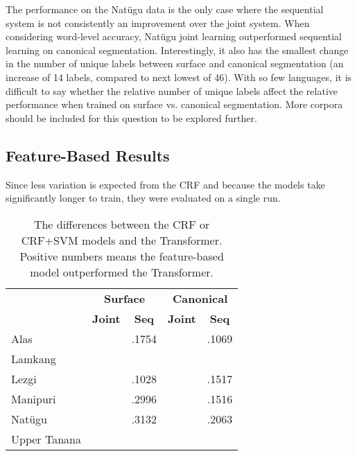 The performance on the Nat\"ugu data is the only case where the sequential system is not consistently an improvement over the joint system. 
When considering word-level accuracy, Nat\"ugu joint learning outperformed sequential learning on canonical segmentation. Interestingly, it also has the smallest change in the number of unique labels between surface and canonical segmentation (an increase of 14 labels, compared to next lowest of 46). With so few languages, it is difficult to say whether the relative number of unique labels affect the relative performance when trained on surface vs. canonical segmentation. More corpora should be included for this question to be explored further. %
 

\subsection{Feature-Based Results}

Since less variation is expected from the CRF and because the models take significantly longer to train, they were evaluated on a single run. 

\begin{table}
    \centering
    \begin{tabular}{l|cc|cc}
        & \multicolumn{2}{c|}{\textbf{Surface}} & \multicolumn{2}{c}{\textbf{Canonical}} \\
        & \textbf{Joint} & \textbf{Seq} & \textbf{Joint} & \textbf{Seq} \\
        \hline
        Alas &  & .1754 &  & .1069 \\
        \hline
        Lamkang &  &  &  &  \\
        \hline
        Lezgi &  & .1028 &  & .1517 \\
        \hline
        Manipuri &  & .2996 &  & .1516 \\
        \hline
        Nat\"ugu &  & .3132 &  & .2063 \\
        \hline
        Upper Tanana &  &  &  &  \\
    \end{tabular}
    \caption[F$_1$-score Differences of Feature-based Models minus Deep Learning]{The differences between the CRF or CRF+SVM models and the Transformer. Positive numbers means the feature-based model outperformed the Transformer.}
    \label{tab:DLFtrResults}
\end{table}


